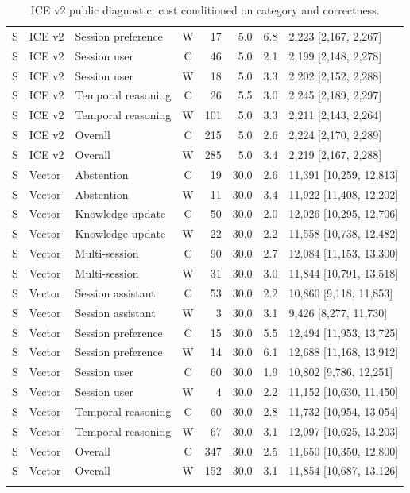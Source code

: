 \documentclass[twoside,11pt]{article}
\begin{document}
\begin{longtable}{@{}L{1.0cm}L{1.0cm}L{2.6cm}crrrL{3.6cm}@{}}
S & ICE v2 & Session preference & W & 17 & 5.0 & 6.8 & 2,223 [2,167, 2,267] \\
S & ICE v2 & Session user & C & 46 & 5.0 & 2.1 & 2,199 [2,148, 2,278] \\
S & ICE v2 & Session user & W & 18 & 5.0 & 3.3 & 2,202 [2,152, 2,288] \\
S & ICE v2 & Temporal reasoning & C & 26 & 5.5 & 3.0 & 2,245 [2,189, 2,297] \\
S & ICE v2 & Temporal reasoning & W & 101 & 5.0 & 3.3 & 2,211 [2,143, 2,264] \\
S & ICE v2 & Overall & C & 215 & 5.0 & 2.6 & 2,224 [2,170, 2,289] \\
S & ICE v2 & Overall & W & 285 & 5.0 & 3.4 & 2,219 [2,167, 2,288] \\
S & Vector & Abstention & C & 19 & 30.0 & 2.6 & 11,391 [10,259, 12,813] \\
S & Vector & Abstention & W & 11 & 30.0 & 3.4 & 11,922 [11,408, 12,202] \\
S & Vector & Knowledge update & C & 50 & 30.0 & 2.0 & 12,026 [10,295, 12,706] \\
S & Vector & Knowledge update & W & 22 & 30.0 & 2.2 & 11,558 [10,738, 12,482] \\
S & Vector & Multi-session & C & 90 & 30.0 & 2.7 & 12,084 [11,153, 13,300] \\
S & Vector & Multi-session & W & 31 & 30.0 & 3.0 & 11,844 [10,791, 13,518] \\
S & Vector & Session assistant & C & 53 & 30.0 & 2.2 & 10,860 [9,118, 11,853] \\
S & Vector & Session assistant & W & 3 & 30.0 & 3.1 & 9,426 [8,277, 11,730] \\
S & Vector & Session preference & C & 15 & 30.0 & 5.5 & 12,494 [11,953, 13,725] \\
S & Vector & Session preference & W & 14 & 30.0 & 6.1 & 12,688 [11,168, 13,912] \\
S & Vector & Session user & C & 60 & 30.0 & 1.9 & 10,802 [9,786, 12,251] \\
S & Vector & Session user & W & 4 & 30.0 & 2.2 & 11,152 [10,630, 11,450] \\
S & Vector & Temporal reasoning & C & 60 & 30.0 & 2.8 & 11,732 [10,954, 13,054] \\
S & Vector & Temporal reasoning & W & 67 & 30.0 & 3.1 & 12,097 [10,625, 13,203] \\
S & Vector & Overall & C & 347 & 30.0 & 2.5 & 11,650 [10,350, 12,800] \\
S & Vector & Overall & W & 152 & 30.0 & 3.1 & 11,854 [10,687, 13,126] \\
\bottomrule\caption{ICE v2 public diagnostic: cost conditioned on category and correctness.}\\
\end{longtable}
\normalsize
\end{document}
